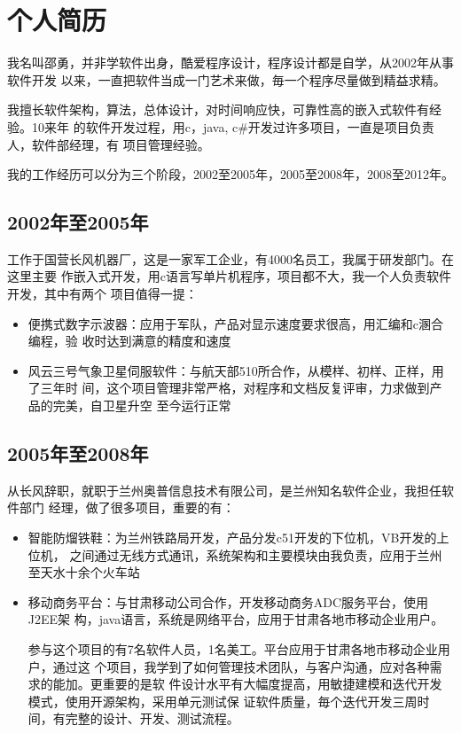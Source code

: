   

\section{个人简历}

我名叫邵勇，并非学软件出身，酷爱程序设计，程序设计都是自学，从2002年从事软件开发
以来，一直把软件当成一门艺术来做，毎一个程序尽量做到精益求精。

我擅长软件架构，算法，总体设计，对时间响应快，可靠性高的嵌入式软件有经验。10来年
的软件开发过程，用c，java, c\#开发过许多项目，一直是项目负责人，软件部经理，有
项目管理经验。

我的工作经历可以分为三个阶段，2002至2005年，2005至2008年，2008至2012年。

\subsection{2002年至2005年}

工作于国营长风机器厂，这是一家军工企业，有4000名员工，我属于研发部门。在这里主要
作嵌入式开发，用c语言写单片机程序，项目都不大，我一个人负责软件开发，其中有两个
项目值得一提：
\begin{itemize}
\item 便携式数字示波器：应用于军队，产品对显示速度要求很高，用汇编和c溷合编程，验
  收时达到满意的精度和速度
\item 风云三号气象卫星伺服软件：与航天部510所合作，从模样、初样、正样，用了三年时
  间，这个项目管理非常严格，对程序和文档反复评审，力求做到产品的完美，自卫星升空
  至今运行正常
\end{itemize}

\subsection{2005年至2008年}

从长风辞职，就职于兰州奥普信息技术有限公司，是兰州知名软件企业，我担任软件部门
经理，做了很多项目，重要的有：
\begin{itemize}
\item 智能防熘铁鞋：为兰州铁路局开发，产品分发c51开发的下位机，VB开发的上位机，
  之间通过无线方式通讯，系统架构和主要模块由我负责，应用于兰州至天水十余个火车站
\item 移动商务平台：与甘肃移动公司合作，开发移动商务ADC服务平台，使用J2EE架
  构，java语言，系统是网络平台，应用于甘肃各地市移动企业用户。

  参与这个项目的有7名软件人员，1名美工。平台应用于甘肃各地市移动企业用户，通过这
  个项目，我学到了如何管理技术团队，与客户沟通，应对各种需求的能加。更重要的是软
  件设计水平有大幅度提高，用敏捷建模和迭代开发模式，使用开源架构，采用单元测试保
  证软件质量，毎个迭代开发三周时间，有完整的设计、开发、测试流程。
\end{itemize}

